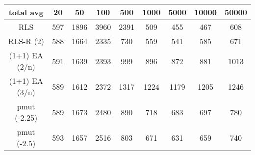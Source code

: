 \begin{tabular}[h]{ccccccccc}
total avg&20&50&100&500&1000&5000&10000&50000\\\hline
RLS&597&1896&3960&2391&509&455&467&608\\
RLS-R (2)&588&1664&2335&730&559&541&585&671\\
(1+1) EA (2/n)&591&1639&2393&999&896&872&881&1013\\
(1+1) EA (3/n)&589&1612&2372&1317&1224&1179&1205&1246\\
pmut (-2.25)&589&1673&2480&890&718&683&697&780\\
pmut (-2.5)&593&1657&2516&803&671&631&659&740\\
\end{tabular}


